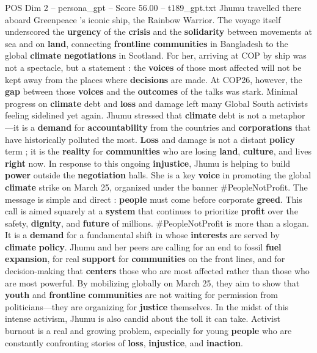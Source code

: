 \begin{textsample}{POS Dim 2 – persona\_gpt – Score 56.00 – t189\_gpt.txt}
Jhumu travelled there aboard Greenpeace ’s iconic ship, the Rainbow Warrior.
The voyage itself underscored the \textbf{urgency} of the \textbf{crisis} and the \textbf{solidarity} between movements at sea and on \textbf{land}, connecting \textbf{frontline} \textbf{communities} in Bangladesh to the global \textbf{climate} \textbf{negotiations} in Scotland.
For her, arriving at COP by ship was not a spectacle, but a statement : the \textbf{voices} of those most affected will not be kept away from the places where \textbf{decisions} are made.
At COP26, however, the \textbf{gap} between those \textbf{voices} and the \textbf{outcomes} of the talks was stark.
Minimal progress on \textbf{climate} debt and \textbf{loss} and damage left many Global South activists feeling sidelined yet again.
Jhumu stressed that \textbf{climate} debt is not a metaphor—it is a \textbf{demand} for \textbf{accountability} from the countries and \textbf{corporations} that have historically polluted the most. \textbf{Loss} and damage is not a distant \textbf{policy} term ; it is the \textbf{reality} for \textbf{communities} who are losing \textbf{land}, \textbf{culture}, and lives \textbf{right} now.
In response to this ongoing \textbf{injustice}, Jhumu is helping to build \textbf{power} outside the \textbf{negotiation} halls.
She is a key \textbf{voice} in promoting the global \textbf{climate} strike on March 25, organized under the banner \#PeopleNotProfit.
The message is simple and direct : \textbf{people} must come before corporate \textbf{greed}.
This call is aimed squarely at a \textbf{system} that continues to prioritize \textbf{profit} over the safety, \textbf{dignity}, and \textbf{future} of millions. \#PeopleNotProfit is more than a slogan.
It is a \textbf{demand} for a fundamental shift in whose \textbf{interests} are served by \textbf{climate} \textbf{policy}.
Jhumu and her peers are calling for an end to fossil \textbf{fuel} \textbf{expansion}, for real \textbf{support} for \textbf{communities} on the front lines, and for decision-making that \textbf{centers} those who are most affected rather than those who are most powerful.
By mobilizing globally on March 25, they aim to show that \textbf{youth} and \textbf{frontline} \textbf{communities} are not waiting for permission from politicians—they are organizing for \textbf{justice} themselves.
In the midst of this intense activism, Jhumu is also candid about the toll it can take.
Activist burnout is a real and growing problem, especially for young \textbf{people} who are constantly confronting stories of \textbf{loss}, \textbf{injustice}, and \textbf{inaction}.

\end{textsample}
